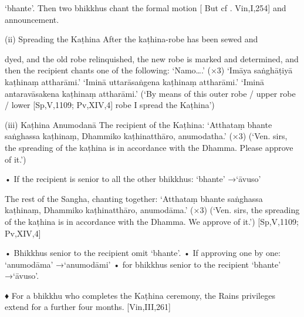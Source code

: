 ‘bhante’.
Then two bhikkhus chant the formal motion
[ But cf . Vin,I,254]
and announcement.

(ii) Spreading the Kaṭhina
After the kaṭhina-robe has been sewed and

dyed, and the old robe relinquished, the new
robe is marked and determined, and then the
recipient chants one of the following:
‘Namo….’ (×3)
‘Imāya saṅghāṭiyā kaṭhinaṃ attharāmi.’
‘Iminā uttarāsaṅgena kaṭhinaṃ attharāmi.’
‘Iminā antaravāsakena kaṭhinaṃ attharāmi.’
(‘By means of this outer robe / upper robe / lower
[Sp,V,1109; Pv,XIV,4]
robe I spread the Kaṭhina’)

(iii) Kaṭhina Anumodanā
The recipient of the Kaṭhina:
‘Atthataṃ bhante saṅghassa kaṭhinaṃ,
Dhammiko kaṭhinatthāro, anumodatha.’ (×3)
(‘Ven. sirs, the spreading of the kaṭhina is in
accordance with the Dhamma. Please approve of it.’)

• If the recipient is senior to all the other
bhikkhus:
‘bhante’ →‘āvuso’

The rest of the Sangha, chanting together:
‘Atthataṃ bhante saṅghassa kaṭhinaṃ,
Dhammiko kaṭhinatthāro, anumodāma.’ (×3)
(‘Ven. sirs, the spreading of the kaṭhina is in
accordance with the Dhamma. We approve of it.’)
[Sp,V,1109; Pv,XIV,4]

• Bhikkhus senior to the recipient omit ‘bhante’.
• If approving one by one:
‘anumodāma’ →‘anumodāmi’
• for bhikkhus senior to the recipient
‘bhante’ →‘āvuso’.

♦ For a bhikkhu who completes the Kaṭhina
ceremony, the Rains privileges extend for a
further four months.
[Vin,III,261]

